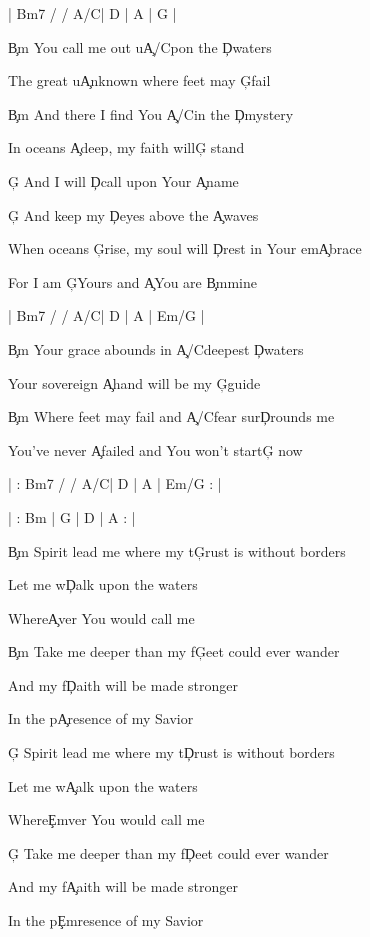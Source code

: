 \documentclass[9pt]{extarticle}
\begin{document}
\bsong

\bi[2]
|  Bm7 / / A/C\s   | D | A | G |
\ei

\bv
\c{Bm} You call me out u\c{A/C\s }pon the \c{D}waters

The great u\c{A}nknown where feet may \c{G}fail

\c{Bm} And there I find You \c{A/C\s }in the \c{D}mystery

In oceans \c{A}deep, my faith will\c{G} stand
\ev

\bc
\c{G} And I will \c{D}call upon Your \c{A}name

\c{G} And keep my \c{D}eyes above the \c{A}waves

When oceans \c{G}rise, my soul will \c{D}rest in Your em\c{A}brace

For I am \c{G}Yours and \c{A}You are \c{Bm}mine
\ec

\bin
|  Bm7 / / A/C\s   | D | A |  Em/G  |
\ein

\bv
\c{Bm} Your grace abounds in \c{A/C\s }deepest \c{D}waters

Your sovereign \c{A}hand will be my \c{G}guide

\c{Bm} Where feet may fail and \c{A/C\s }fear sur\c{D}rounds me

You've never \c{A}failed and You won't start\c{G} now
\ev


\bin
| : Bm7 / / A/C\s   | D | A |  Em/G : |

| : Bm | G | D | A : |
\ein

\bb[3]
\c{Bm} Spirit lead me where my t\c{G}rust is without borders

Let me w\c{D}alk upon the waters

Where\c{A}ver You would call me

\c{Bm} Take me deeper than my f\c{G}eet could ever wander

And my f\c{D}aith will be made stronger

In the p\c{A}resence of my Savior
\eb

\bb
\c{G} Spirit lead me where my t\c{D}rust is without borders

Let me w\c{A}alk upon the waters

Where\c{Em}ver You would call me

\c{G} Take me deeper than my f\c{D}eet could ever wander

And my f\c{A}aith will be made stronger

In the p\c{Em}resence of my Savior
\eb
\end{document}
